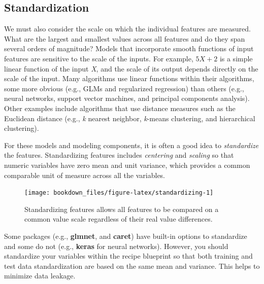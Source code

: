 \documentclass[]{krantz}
\begin{document}
\hypertarget{standardization}{%
\subsection{Standardization}\label{standardization}}

We must also consider the scale on which the individual features are measured. What are the largest and smallest values across all features and do they span several orders of magnitude? Models that incorporate smooth functions of input features are sensitive to the scale of the inputs. For example, \(5X+2\) is a simple linear function of the input \emph{X}, and the scale of its output depends directly on the scale of the input. Many algorithms use linear functions within their algorithms, some more obvious (e.g., GLMs and regularized regression) than others (e.g., neural networks, support vector machines, and principal components analysis). Other examples include algorithms that use distance measures such as the Euclidean distance (e.g., \emph{k} nearest neighbor, \emph{k}-means clustering, and hierarchical clustering).

For these models and modeling components, it is often a good idea to \emph{standardize} the features. Standardizing features includes \emph{centering} and \emph{scaling} so that numeric variables have zero mean and unit variance, which provides a common comparable unit of measure across all the variables.

\begin{figure}

{\centering \texttt{[image: bookdown\_files/figure-latex/standardizing-1]} 

}

\caption{Standardizing features allows all features to be compared on a common value scale regardless of their real value differences.}\label{fig:standardizing}
\end{figure}

Some packages (e.g., \textbf{glmnet}, and \textbf{caret}) have built-in options to standardize and some do not (e.g., \textbf{keras} for neural networks). However, you should standardize your variables within the recipe blueprint so that both training and test data standardization are based on the same mean and variance. This helps to minimize data leakage.
\end{document}
